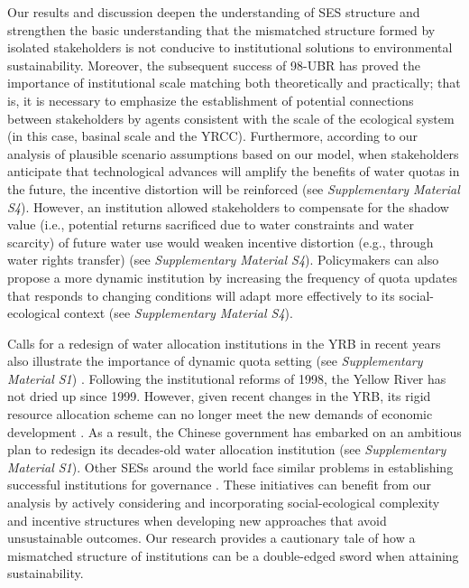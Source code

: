 Our results and discussion deepen the understanding of SES structure and strengthen the basic understanding that the mismatched structure formed by isolated stakeholders is not conducive to institutional solutions to environmental sustainability.
Moreover, the subsequent success of 98-UBR has proved the importance of institutional scale matching both theoretically and practically; that is, it is necessary to emphasize the establishment of potential connections between stakeholders by agents consistent with the scale of the ecological system (in this case, basinal scale and the YRCC).
Furthermore, according to our analysis of plausible scenario assumptions based on our model, when stakeholders anticipate that technological advances will amplify the benefits of water quotas in the future, the incentive distortion will be reinforced (see \textit{Supplementary Material S4}).
However, an institution allowed stakeholders to compensate for the shadow value (i.e., potential returns sacrificed due to water constraints and water scarcity) \cite{howarth2002} of future water use would weaken incentive distortion (e.g., through water rights transfer) (see \textit{Supplementary Material S4}).
Policymakers can also propose a more dynamic institution by increasing the frequency of quota updates that responds to changing conditions will adapt more effectively to its social-ecological context (see \textit{Supplementary Material S4}).

Calls for a redesign of water allocation institutions in the YRB in recent years also illustrate the importance of dynamic quota setting (see \textit{Supplementary Material S1}) \cite{yu2019}. Following the institutional reforms of 1998, the Yellow River has not dried up since 1999. However, given recent changes in the YRB, its rigid resource allocation scheme can no longer meet the new demands of economic development \cite{wang2019a}. As a result, the Chinese government has embarked on an ambitious plan to redesign its decades-old water allocation institution (see \textit{Supplementary Material S1}). Other SESs around the world face similar problems in establishing successful institutions for governance \cite{cumming2020b, muneepeerakul2017, cumming2020a, leslie2015}. These initiatives can benefit from our analysis by actively considering and incorporating social-ecological complexity and incentive structures when developing new approaches that avoid unsustainable outcomes. Our research provides a cautionary tale of how a mismatched structure of institutions can be a double-edged sword when attaining sustainability.
